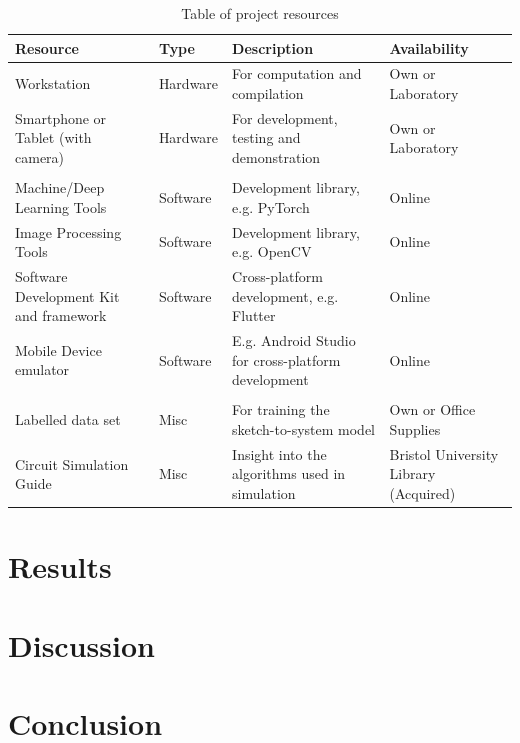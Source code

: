\documentclass[11pt]{article}
\begin{document}
\begin{table}[hptb]
    \footnotesize\centering
    \begin{tabular}{
        @{}
        >{\raggedright\arraybackslash}p{5cm}
        >{\raggedright\arraybackslash}p{2cm}
        >{\raggedright\arraybackslash}p{5cm}
        >{\raggedright\arraybackslash}p{4cm}
        @{}}
        Resource                               & Type     & Description                                        & Availability                          \\
        \toprule
        Workstation                            & Hardware & For computation and compilation                    & Own or Laboratory                     \\
        Smartphone or Tablet (with camera)     & Hardware & For development, testing and demonstration         & Own or Laboratory                     \\
                                               &          &                                                    &                                       \\
        Machine/Deep Learning Tools            & Software & Development library, e.g. PyTorch                  & Online                                \\
        Image Processing Tools                 & Software & Development library, e.g. OpenCV                   & Online                                \\
        Software Development Kit and framework & Software & Cross-platform development, e.g. Flutter           & Online                                \\
        Mobile Device emulator                 & Software & E.g. Android Studio for cross-platform development & Online                                \\
                                               &          &                                                    &                                       \\
        Labelled data set                      & Misc     & For training the sketch-to-system model            & Own or Office Supplies                \\
        Circuit Simulation Guide               & Misc     & Insight into the algorithms used in simulation     & Bristol University Library (Acquired) \\
    \end{tabular}
    \caption{Table of project resources}
    \label{tab:Table of project resources}
\end{table}

\pagebreak
\section{Results}
\label{sec:Results}

\pagebreak
\section{Discussion}
\label{sec:Discussion}

\pagebreak
\section{Conclusion}
\label{sec:Conclusion}

\pagebreak

{\raggedright }
\end{document}
